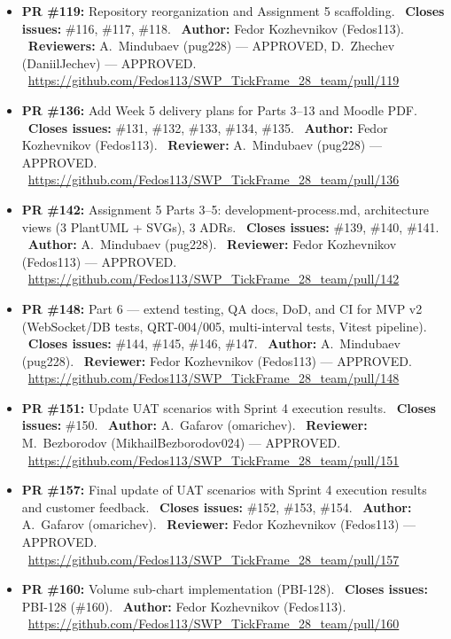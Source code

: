 \documentclass[11pt,a4paper]{article}
\begin{document}
\begin{itemize}[leftmargin=*]
    \item \textbf{PR \#119:} Repository reorganization and Assignment 5 scaffolding. \
          \textbf{Closes issues:} \#116, \#117, \#118. \
          \textbf{Author:} Fedor Kozhevnikov (Fedos113). \
          \textbf{Reviewers:} A.~Mindubaev (pug228) --- APPROVED, D.~Zhechev (DaniilJechev) --- APPROVED. \
          \url{https://github.com/Fedos113/SWP_TickFrame_28_team/pull/119}

    \item \textbf{PR \#136:} Add Week 5 delivery plans for Parts 3--13 and Moodle PDF. \
          \textbf{Closes issues:} \#131, \#132, \#133, \#134, \#135. \
          \textbf{Author:} Fedor Kozhevnikov (Fedos113). \
          \textbf{Reviewer:} A.~Mindubaev (pug228) --- APPROVED. \
          \url{https://github.com/Fedos113/SWP_TickFrame_28_team/pull/136}

    \item \textbf{PR \#142:} Assignment 5 Parts 3--5: development-process.md, architecture views (3 PlantUML + SVGs), 3 ADRs. \
          \textbf{Closes issues:} \#139, \#140, \#141. \
          \textbf{Author:} A.~Mindubaev (pug228). \
          \textbf{Reviewer:} Fedor Kozhevnikov (Fedos113) --- APPROVED. \
          \url{https://github.com/Fedos113/SWP_TickFrame_28_team/pull/142}

    \item \textbf{PR \#148:} Part 6 --- extend testing, QA docs, DoD, and CI for MVP v2 (WebSocket/DB tests, QRT-004/005, multi-interval tests, Vitest pipeline). \
          \textbf{Closes issues:} \#144, \#145, \#146, \#147. \
          \textbf{Author:} A.~Mindubaev (pug228). \
          \textbf{Reviewer:} Fedor Kozhevnikov (Fedos113) --- APPROVED. \
          \url{https://github.com/Fedos113/SWP_TickFrame_28_team/pull/148}

    \item \textbf{PR \#151:} Update UAT scenarios with Sprint 4 execution results. \
          \textbf{Closes issues:} \#150. \
          \textbf{Author:} A.~Gafarov (omarichev). \
          \textbf{Reviewer:} M.~Bezborodov (MikhailBezborodov024) --- APPROVED. \
          \url{https://github.com/Fedos113/SWP_TickFrame_28_team/pull/151}

    \item \textbf{PR \#157:} Final update of UAT scenarios with Sprint 4 execution results and customer feedback. \
          \textbf{Closes issues:} \#152, \#153, \#154. \
          \textbf{Author:} A.~Gafarov (omarichev). \
          \textbf{Reviewer:} Fedor Kozhevnikov (Fedos113) --- APPROVED. \
          \url{https://github.com/Fedos113/SWP_TickFrame_28_team/pull/157}

    \item \textbf{PR \#160:} Volume sub-chart implementation (PBI-128). \
          \textbf{Closes issues:} PBI-128 (\#160). \
          \textbf{Author:} Fedor Kozhevnikov (Fedos113). \
          \url{https://github.com/Fedos113/SWP_TickFrame_28_team/pull/160}
\end{itemize}
\end{document}
